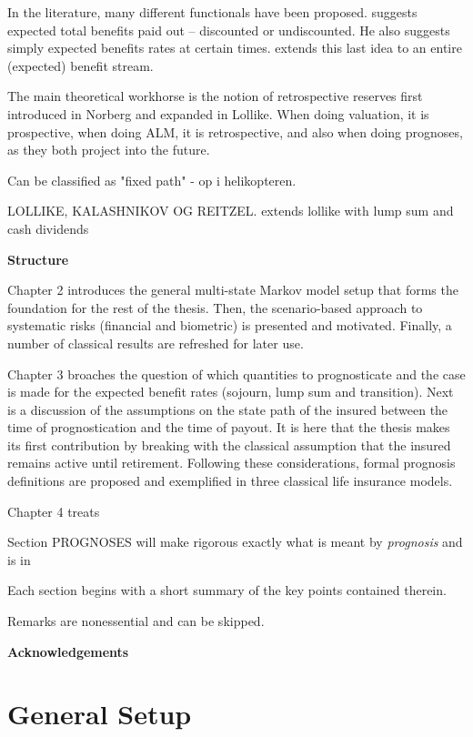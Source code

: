 \documentclass{article}
\newcommand{\1}[1]{\mathbbm{1}_{\left\lbrace #1 \right\rbrace}}
\theoremstyle{break}
\theoremstyle{remark}
\numberwithin{equation}{section}
\begin{document}
In the literature, many different functionals have been proposed. \cite{Norberg2001} suggests expected total benefits paid out -- discounted or undiscounted. He also suggests simply expected benefits rates at certain times. \cite{NinnaReitzel} extends this last idea to an entire (expected) benefit stream.

The main theoretical workhorse is the notion of retrospective reserves first introduced in Norberg and expanded in Lollike. When doing valuation, it is prospective, when doing ALM, it is retrospective, and also when doing prognoses, as they both project into the future.

Can be classified as "fixed path" - op i helikopteren.

LOLLIKE, KALASHNIKOV OG REITZEL. extends lollike with lump sum and cash dividends

\textbf{Structure}

Chapter 2 introduces the general multi-state Markov model setup that forms the foundation for the rest of the thesis. Then, the scenario-based approach to systematic risks (financial and biometric) is presented and motivated. Finally, a number of classical results are refreshed for later use.

Chapter 3 broaches the question of which quantities to prognosticate and the case is made for the expected benefit rates (sojourn, lump sum and transition). Next is a discussion of the assumptions on the state path of the insured between the time of prognostication and the time of payout. It is here that the thesis makes its first contribution by breaking with the classical assumption that the insured remains active until retirement. Following these considerations, formal prognosis definitions are proposed and exemplified in three classical life insurance models.

Chapter 4 treats 

Section PROGNOSES will make rigorous exactly what is meant by \textit{prognosis} and is in

Each section begins with a short summary of the key points contained therein.

Remarks are nonessential and can be skipped.

\textbf{Acknowledgements}

\newpage

\section{General Setup}
\end{document}
